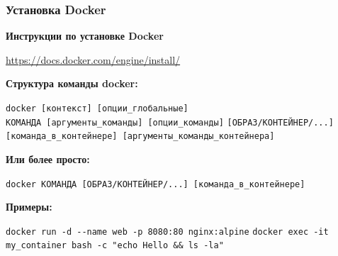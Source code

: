 \documentclass[9pt, aspectratio=1610]{beamer}
\begin{document}
\begin{frame}[fragile=singleslide]\frametitle{Установка Docker}
	
	\begin{varwidth}{\textwidth}
		
		\textbf{Инструкции по установке Docker}
		
		\href{https://docs.docker.com/engine/install/}{\color{magenta}https://docs.docker.com/engine/install/}
		
	\end{varwidth}
	
	
	
	\smallskip
	
	
	\medskip
	
	\textbf{Структура команды docker:}
	
	\Verb|docker [контекст] [опции_глобальные]|\\
	\Verb|КОМАНДА [аргументы_команды] [опции_команды]|
	\Verb|[ОБРАЗ/КОНТЕЙНЕР/...] [команда_в_контейнере] [аргументы_команды_контейнера]|
	
	\medskip
	
	\textbf{Или более просто:}
	
	\Verb|docker КОМАНДА [ОБРАЗ/КОНТЕЙНЕР/...] [команда_в_контейнере]|
	
	\medskip
	
	\textbf{Примеры:}
	
	\Verb|docker run -d --name web -p 8080:80 nginx:alpine|
	\Verb|docker exec -it my_container bash -c "echo Hello && ls -la"|
	
\end{frame}
\end{document}
